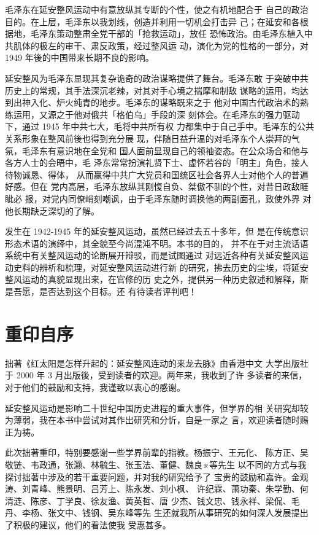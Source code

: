\begin{fzliukai}
毛泽东在延安整风运动中有意放纵其专断的个性，使之有机地配合于
自己的政治目的。在上层，毛泽东以我划线，创造并利用一切机会打击异
己；在延安和各根据地，毛泽东策动整肃全党干部的「抢救运动」，放任
恐怖政治。由毛泽东植入中共肌体的极左的审干、肃反政策，经过整风运
动，演化为党的性格的一部分，对 1949 年後的中国带来长期不良的影响。

延安整风为毛泽东显现其复杂诡奇的政治谋略提供了舞台。毛泽东敢
于突破中共历史上的常规，其手法深沉老辣，对其对手心境之揣摩和制敌
谋略的运用，均达到出神入化、炉火纯青的地步。毛泽东的谋略既来之于
他对中国古代政治术的熟练运用，又源之于他对俄共「格伯乌」手段的深
刻体会。在毛泽东的强力驱动下，通过 1945 年中共七大，毛将中共所有权
力都集中于自己手中。毛泽东的公共关系形象在整风前後也得到充分展
现，伴随日益升温的对毛泽东个人崇拜的气氛，毛泽东有意识地在全党和
国人面前显现自己的领袖姿态。在公众场合和他与各方人士的会晤中，毛
泽东常常扮演礼贤下士、虚怀若谷的「明主」角色，接人待物诚恳、得体，
从而赢得中共广大党员和国统区社会各界人士对他个人的普遍好感。但在
党内高层，毛泽东放纵其刚愎自负、桀傲不驯的个性，对昔日政敌睚眦必
报，对党内同僚峭刻嘲讽，由于毛泽东随时调换他的两副面孔，致使外界
对他长期缺乏深切的了解。

发生在 1942-1945 年的延安整风运动，虽然已经过去五十多年，但
是在传统意识形态术语的演绎中，其全貌至今尚混沌不明。本书的目的，
并不在于对主流话语系统中有关整风运动的论断展开辩驳，而是试图通过
对远近各种有关延安整风运动史料的辨析和梳理，对延安整风运动进行新
的研究，拂去历史的尘埃，将延安整风运动的真貌显现出来，在官修的历
史之外，提供另一种历史叙述和解释，斯是吾愿，是否达到这个目标。还
有待读者评判吧！

\chapter*{重印自序}
拙著《红太阳是怎样升起的：延安整风连动的来龙去脉》由香港中文
大学出版社于 2000 年 3 月出版後，受到读者的欢迎。两年来，我收到了许
多读者的来信，对于他们的鼓励和支持，我谨致以衷心的感谢。

延安整风运动是影响二十世纪中国历史进程的重大事件，但学界的相
关研究却较为薄弱，我在本书中尝试对其作出研究和分忻，自是一家之
言，欢迎读者随时赐正为祷。

此次拙著重印，特别要感谢一些学界前辈的指教。杨振宁、王元化、
陈方正、吴敬链、韦政通，张灏、林毓生、张玉法、董健、魏良※等先生
以不同的方式与我探讨拙著中涉及的若干重要问题，并对我的研究给予了
宝贵的鼓励和嘉许。金观涛、刘青峰、熊景明、吕芳上、陈永发、刘小枫、
许纪霖、萧功秦、朱学勤、何清涟、陈彦、丁学良、徐友渔、黄英哲、唐
少杰、钱文忠、钱永祥、梁侃、毛丹、李杨、张文中、钱钢、吴东峰等先
生还就我所从事研究的如何深人发展提出了积极的建议，他们的看法使我
受惠甚多。


\end{fzliukai}
